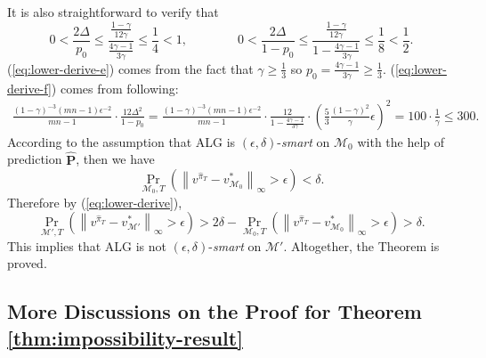 \documentclass[12pt]{article}
\begin{document}
It is also straightforward to verify that
\begin{equation*}
    0 < \frac{2\Delta}{p_0} \le \frac{\frac{1 - \gamma}{12 \gamma}}{\frac{4 \gamma - 1}{3 \gamma }} \le \frac{1}{4} < 1,\qquad \qquad 0 < \frac{2 \Delta}{1 - p_0} \le \frac{\frac{1 - \gamma}{12 \gamma}}{1 - \frac{4 \gamma - 1}{3 \gamma }} \le \frac{1}{8} < \frac{1}{2}.
\end{equation*}
(\ref{eq:lower-derive-e}) comes from the fact that $\gamma \ge \frac{1}{3}$ so $p_0 = \frac{4 \gamma - 1}{3 \gamma} \ge \frac{1}{3}$. (\ref{eq:lower-derive-f}) comes from following:
\begin{equation*}
    \begin{aligned}
        \frac{(1-\gamma)^{-3} (mn-1) \epsilon^{-2}}{mn-1} \cdot \frac{12 \Delta^2}{1-p_0} = \frac{(1-\gamma)^{-3} (mn-1) \epsilon^{-2}}{mn-1} \cdot \frac{12 }{1-\frac{4 \gamma - 1}{3 \gamma }} \cdot \left( \frac{5}{3} \frac{(1-\gamma)^2}{\gamma} \epsilon\right) ^2  = 100 \cdot \frac{1}{\gamma } \le 300.
    \end{aligned}
\end{equation*}
According to the assumption that ALG is $(\epsilon,\delta)$-\textit{smart} on $\mathcal{M}_0$ with the help of prediction $\hat{\boldsymbol{\text{P}}}$, then we have
\begin{equation*}
    \Pr_{\mathcal{M}_0,T} \left( \left\| v^{\hat{\pi}_T} - v^*_{\mathcal{M}_0} \right \|_{\infty}  >\epsilon \right) < \delta.
\end{equation*}
Therefore by (\ref{eq:lower-derive}),
\begin{equation*}
    \Pr_{\mathcal{M}',T} \left( \left\| v^{\hat{\pi}_T} - v^*_{\mathcal{M}'} \right \|_{\infty}  >\epsilon \right) > 2\delta - \Pr_{\mathcal{M}_0,T} \left( \left\| v^{\hat{\pi}_T} - v^*_{\mathcal{M}_0} \right \|_{\infty}  >\epsilon \right) > \delta.
\end{equation*}
This implies that ALG is not $(\epsilon,\delta)$-\textit{smart} on $\mathcal{M}'$. Altogether, the Theorem is proved.

\subsection{More Discussions on the Proof for Theorem \ref{thm:impossibility-result}}
\end{document}
